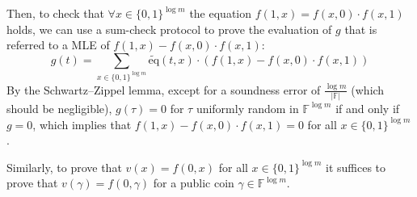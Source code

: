 \documentclass[../../book]{subfiles}
\begin{document}
Then, to check that $\forall x \in \{0,1\}^{\log m}$ the equation $f(1,x) = f(x, 0) \cdot f(x, 1)$ holds, we can use 
a sum-check protocol to prove the evaluation of $g$ that is referred to a MLE of $f(1,x) - f(x, 0) \cdot f(x, 1)$:
\begin{equation*}
    g(t) = \sum_{x \in \{0,1\}^{\log m}} \widetilde{\text{eq}}(t,x) \cdot (f(1,x) - f(x, 0) \cdot f(x, 1))
\end{equation*}
By the Schwartz–Zippel lemma, except for a soundness error of $\frac{\log m}{|\mathbb{F}|}$ (which should be negligible),
 $g(\tau) = 0$ for $\tau$ uniformly random in $\mathbb{F}^{\log m}$ if and only if $g = 0$, which implies that 
 $f(1, x) - f(x, 0) \cdot f(x, 1) = 0$ for all $x \in \{0, 1\}^{\log m}$.

Similarly, to prove that $v(x) = f(0, x)$ for all $x \in \{0, 1\}^{\log m}$ it suffices to prove that $v(\gamma) = f(0, \gamma)$
 for a public coin $\gamma \in \mathbb{F}^{\log m}$.
\end{document}
